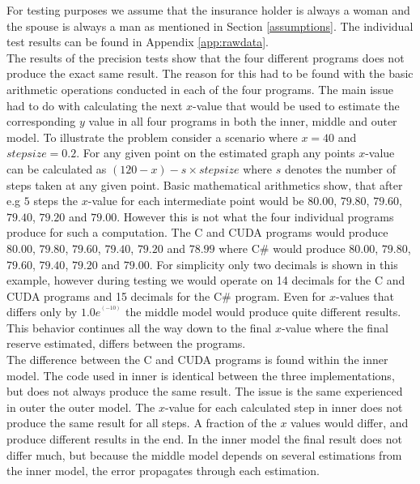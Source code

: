 For testing purposes we assume that the insurance holder is always a woman and the spouse is always a man as mentioned in Section \ref{assumptions}. The individual test results can be found in Appendix \ref{app:rawdata}.\\

The results of the precision tests show that the four different programs does not produce the exact same result. The reason for this had to be found with the basic arithmetic operations conducted in each of the four programs. The main issue had to do with calculating the next $x$-value that would be used to estimate the corresponding $y$ value in all four programs in both the inner, middle and outer model. To illustrate the problem consider a scenario where $x = 40$ and $stepsize = 0.2$. For any given point on the estimated graph any points $x$-value can be calculated as $(120-x)-s \times stepsize$ where $s$ denotes the number of steps taken at any given point. Basic mathematical arithmetics show, that after e.g $5$ steps the $x$-value for each intermediate point would be $80.00$, $79.80$, $79.60$, $79.40$, $79.20$ and $79.00$. However this is not what the four individual programs produce for such a computation. The C and CUDA programs would produce $80.00$, $79.80$, $79.60$, $79.40$, $79.20$ and $78.99$ where C\# would produce $80.00$, $79.80$, $79.60$, $79.40$, $79.20$ and $79.00$. For simplicity only two decimals is shown in this example, however during testing we would operate on 14 decimals for the C and CUDA programs and 15 decimals for the C\# program. Even for $x$-values that differs only by $1.0e^^(-10)$ the middle model would produce quite different results. This behavior continues all the way down to the final $x$-value where the final reserve estimated, differs between the programs.\\

The difference between the C and CUDA programs is found within the inner model. The code used in inner is identical between the three implementations, but does not always produce the same result. The issue is the same experienced in outer the outer model. The $x$-value for each calculated step in inner does not produce the same result for all steps. A fraction of the $x$ values would differ, and produce different results in the end. In the inner model the final result does not differ much, but because the middle model depends on several estimations from the inner model, the error propagates through each estimation.\\

